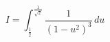 \begin{displaymath}
 I=\int_{\frac{1}{2}}^{\frac{1}{\sqrt{2}}}\frac{1}{(1-u^2)^3}\,du
\end{displaymath}
